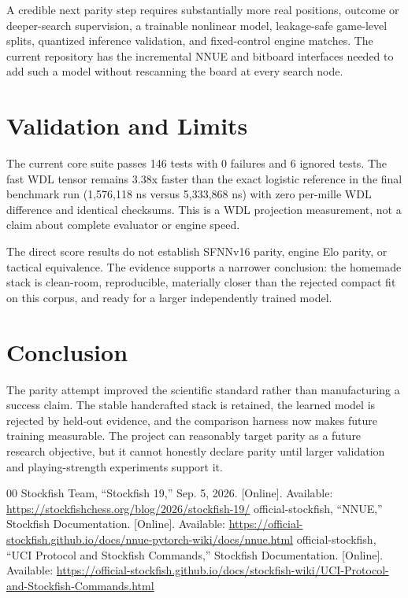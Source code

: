 \documentclass[10pt,conference]{IEEEtran}
\begin{document}
A credible next parity step requires substantially more real positions, outcome or deeper-search supervision, a trainable nonlinear model, leakage-safe game-level splits, quantized inference validation, and fixed-control engine matches. The current repository has the incremental NNUE and bitboard interfaces needed to add such a model without rescanning the board at every search node.

\section{Validation and Limits}
The current core suite passes 146 tests with 0 failures and 6 ignored tests. The fast WDL tensor remains 3.38x faster than the exact logistic reference in the final benchmark run (1,576,118 ns versus 5,333,868 ns) with zero per-mille WDL difference and identical checksums. This is a WDL projection measurement, not a claim about complete evaluator or engine speed.

The direct score results do not establish SFNNv16 parity, engine Elo parity, or tactical equivalence. The evidence supports a narrower conclusion: the homemade stack is clean-room, reproducible, materially closer than the rejected compact fit on this corpus, and ready for a larger independently trained model.

\section{Conclusion}
The parity attempt improved the scientific standard rather than manufacturing a success claim. The stable handcrafted stack is retained, the learned model is rejected by held-out evidence, and the comparison harness now makes future training measurable. The project can reasonably target parity as a future research objective, but it cannot honestly declare parity until larger validation and playing-strength experiments support it.

\begin{thebibliography}{00}
 Stockfish Team, ``Stockfish 19,'' Sep. 5, 2026. [Online]. Available: \url{https://stockfishchess.org/blog/2026/stockfish-19/}
 official-stockfish, ``NNUE,'' Stockfish Documentation. [Online]. Available: \url{https://official-stockfish.github.io/docs/nnue-pytorch-wiki/docs/nnue.html}
 official-stockfish, ``UCI Protocol and Stockfish Commands,'' Stockfish Documentation. [Online]. Available: \url{https://official-stockfish.github.io/docs/stockfish-wiki/UCI-Protocol-and-Stockfish-Commands.html}
\end{thebibliography}
\end{document}
